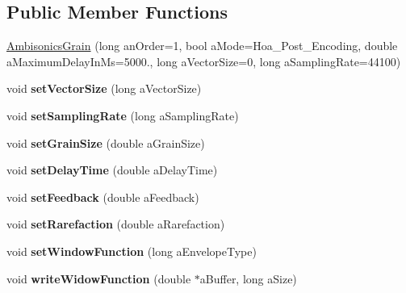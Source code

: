 \subsection*{Public Member Functions}
\begin{DoxyCompactItemize}
\item 
\hyperlink{class_ambisonics_grain_a5e83b470e8597a5dd7b11860ef6fd456}{Ambisonics\-Grain} (long an\-Order=1, bool a\-Mode=Hoa\-\_\-\-Post\-\_\-\-Encoding, double a\-Maximum\-Delay\-In\-Ms=5000., long a\-Vector\-Size=0, long a\-Sampling\-Rate=44100)
\item 
\hypertarget{class_ambisonics_grain_a692b688e9dfb85fcced9984ce0a05074}{void {\bfseries set\-Vector\-Size} (long a\-Vector\-Size)}\label{class_ambisonics_grain_a692b688e9dfb85fcced9984ce0a05074}

\item 
\hypertarget{class_ambisonics_grain_aec7b61861c3e34b8b50f763935bf9598}{void {\bfseries set\-Sampling\-Rate} (long a\-Sampling\-Rate)}\label{class_ambisonics_grain_aec7b61861c3e34b8b50f763935bf9598}

\item 
\hypertarget{class_ambisonics_grain_a331a0a6675e4b22084e56fe4d3baa416}{void {\bfseries set\-Grain\-Size} (double a\-Grain\-Size)}\label{class_ambisonics_grain_a331a0a6675e4b22084e56fe4d3baa416}

\item 
\hypertarget{class_ambisonics_grain_a75c24ed2a11ea7b9c85560b74ca66c32}{void {\bfseries set\-Delay\-Time} (double a\-Delay\-Time)}\label{class_ambisonics_grain_a75c24ed2a11ea7b9c85560b74ca66c32}

\item 
\hypertarget{class_ambisonics_grain_acc12a353444edcb2c3325b1acf891ae9}{void {\bfseries set\-Feedback} (double a\-Feedback)}\label{class_ambisonics_grain_acc12a353444edcb2c3325b1acf891ae9}

\item 
\hypertarget{class_ambisonics_grain_a446e9facc6e127555d5e314be150896e}{void {\bfseries set\-Rarefaction} (double a\-Rarefaction)}\label{class_ambisonics_grain_a446e9facc6e127555d5e314be150896e}

\item 
\hypertarget{class_ambisonics_grain_a0b0509403cc2e98363e8ffdb60db9ea0}{void {\bfseries set\-Window\-Function} (long a\-Envelope\-Type)}\label{class_ambisonics_grain_a0b0509403cc2e98363e8ffdb60db9ea0}

\item 
\hypertarget{class_ambisonics_grain_a54dc530776c4a2565319cf13e69ae7e2}{void {\bfseries write\-Widow\-Function} (double $\ast$a\-Buffer, long a\-Size)}\label{class_ambisonics_grain_a54dc530776c4a2565319cf13e69ae7e2}


\end{DoxyCompactItemize}
